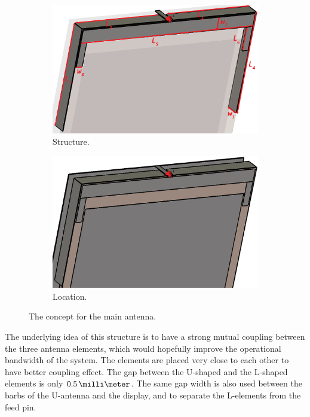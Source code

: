 \begin{figure}[H]
    \centering
    \begin{subfigure}[b]{0.49\textwidth}
        \includegraphics[width=\textwidth]{img/main_concept.eps}
        \caption{Structure.}
        \label{fig:main_concept}
    \end{subfigure}
    \begin{subfigure}[b]{0.49\textwidth}
        \includegraphics[width=\textwidth]{img/main_location.eps}
        \caption{Location.}
        \label{fig:main_location}
    \end{subfigure}
    \caption{The concept for the main antenna.}
    \label{fig:main_antenna1}
\end{figure}

The underlying idea of this structure is to have a strong mutual coupling between the three antenna elements, which would hopefully improve the operational bandwidth of the system. The elements are placed very close to each other to have better coupling effect. The gap between the U-shaped and the L-shaped elements is only $0.5\,\milli\meter$. The same gap width is also used between the barbs of the U-antenna and the display, and to separate the L-elements from the feed pin.


